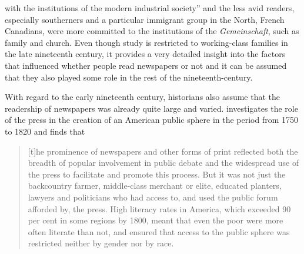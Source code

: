 with the institutions of the modern industrial society” \citep[240]{Nord2001} and the less avid readers, especially southerners and a particular immigrant group in the North, French Canadians, were more committed to the institutions of the \emph{Gemeinschaft}, such as family and church. Even though  study is restricted to working-class families in the late nineteenth century, it provides a very detailed insight into the factors that influenced whether people read newspapers or not and it can be assumed that they also played some role in the rest of the nineteenth-century.

With regard to the early nineteenth century, historians also assume that the readership of newspapers was already quite large and varied. \citet[141]{Copeland2002} investigates the role of the press in the creation of an American public sphere in the period from 1750 to 1820 and finds that

\begin{quote}
[t]he prominence of newspapers and other forms of print reflected both the breadth of popular involvement in public debate and the widespread use of the press to facilitate and promote this process. But it was not just the backcountry farmer, middle-class merchant or elite, educated planters, lawyers and politicians who had access to, and used the public forum afforded by, the press. High literacy rates in America, which exceeded 90 per cent in some regions by 1800, meant that even the poor were more often literate than not, and ensured that access to the public sphere was restricted neither by gender nor by race.
\end{quote}


